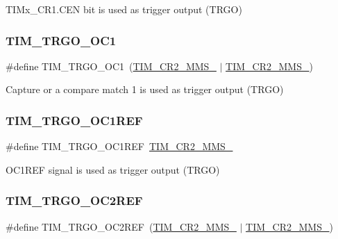 T\+I\+Mx\+\_\+\+C\+R1.\+C\+EN bit is used as trigger output (T\+R\+GO) \mbox{\label{group___t_i_m___master___mode___selection_ga80aa9a9c41de509d99fc4cb492d6513f}} 
\subsubsection{\texorpdfstring{TIM\_TRGO\_OC1}{TIM\_TRGO\_OC1}}
{\footnotesize\ttfamily \#define T\+I\+M\+\_\+\+T\+R\+G\+O\+\_\+\+O\+C1~(\mbox{\hyperlink{group___peripheral___registers___bits___definition_ga4b1036929b0a4ba5bd5cced9b8e0f4c3}{T\+I\+M\+\_\+\+C\+R2\+\_\+\+M\+M\+S\+\_}} $\vert$ \mbox{\hyperlink{group___peripheral___registers___bits___definition_gaf3e55308e84106d6501201e66bd46ab6}{T\+I\+M\+\_\+\+C\+R2\+\_\+\+M\+M\+S\+\_}})}

Capture or a compare match 1 is used as trigger output (T\+R\+GO) \mbox{\label{group___t_i_m___master___mode___selection_gaed715aa7ec4ad0f7f5d82dde6d964178}} 
\subsubsection{\texorpdfstring{TIM\_TRGO\_OC1REF}{TIM\_TRGO\_OC1REF}}
{\footnotesize\ttfamily \#define T\+I\+M\+\_\+\+T\+R\+G\+O\+\_\+\+O\+C1\+R\+EF~\mbox{\hyperlink{group___peripheral___registers___bits___definition_gacb74a815afdd856d51cfcf1ddf3fce6a}{T\+I\+M\+\_\+\+C\+R2\+\_\+\+M\+M\+S\+\_}}}

O\+C1\+R\+EF signal is used as trigger output (T\+R\+GO) \mbox{\label{group___t_i_m___master___mode___selection_gaaedc4b3f4c5c3c8b45a2cf1b73e33c0a}} 
\subsubsection{\texorpdfstring{TIM\_TRGO\_OC2REF}{TIM\_TRGO\_OC2REF}}
{\footnotesize\ttfamily \#define T\+I\+M\+\_\+\+T\+R\+G\+O\+\_\+\+O\+C2\+R\+EF~(\mbox{\hyperlink{group___peripheral___registers___bits___definition_gacb74a815afdd856d51cfcf1ddf3fce6a}{T\+I\+M\+\_\+\+C\+R2\+\_\+\+M\+M\+S\+\_}} $\vert$ \mbox{\hyperlink{group___peripheral___registers___bits___definition_gaf3e55308e84106d6501201e66bd46ab6}{T\+I\+M\+\_\+\+C\+R2\+\_\+\+M\+M\+S\+\_}})}

